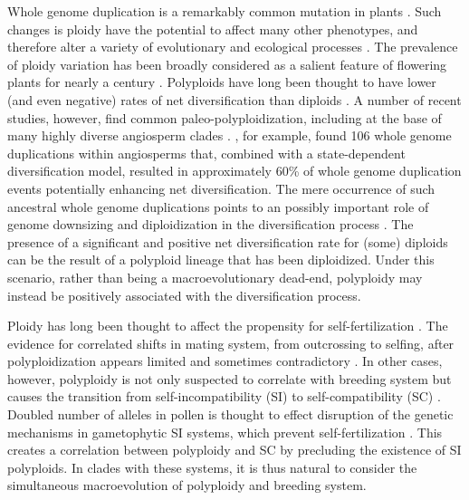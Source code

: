 Whole genome duplication is a remarkably common mutation in plants \citep{husband_2013, zenilferguson_2017}.
Such changes is ploidy have the potential to affect many other phenotypes, and therefore alter a variety of evolutionary \citep{ramsey_2002} and ecological processes \citep{sessa_2019}.
The prevalence of ploidy variation has been broadly considered as a salient feature of flowering plants for nearly a century \citep{stebbins1938}. 
Polyploids have long been thought to have lower (and even negative) rates of net diversification than diploids \citep{mayrose_2011, mayrose_2015}. 
A number of recent studies, however, find common paleo-polyploidization, including at the base of many highly diverse angiosperm clades \citep{soltis_2014}. 
\citet{landis_2018}, for example, found 106 whole genome duplications within angiosperms that, combined with a state-dependent diversification model, resulted in approximately 60\% of whole genome duplication events potentially enhancing net diversification.
The mere occurrence of such ancestral whole genome duplications points to an possibly important role of genome downsizing and diploidization in the diversification process \citep{soltis_2015diploidization, dodsworth_2015}. 
The presence of a significant and positive net diversification rate for (some) diploids can be  the result of a polyploid lineage that has been diploidized. 
Under this scenario, rather than being a macroevolutionary dead-end, polyploidy may instead be positively associated with the diversification process. 

Ploidy has long been thought to affect the propensity for self-fertilization \citep{stebbins1950}. 
The evidence for correlated shifts in mating system, from outcrossing to selfing, after polyploidization appears limited and sometimes contradictory \citep{barringer2007, barrett2008, husband2008}.
In other cases, however, polyploidy is not only suspected to correlate with breeding system but causes the transition from self-incompatibility (SI) to self-compatibility (SC) \citep{stout1942, lewis1947}.
Doubled number of alleles in pollen is thought to effect disruption of the genetic mechanisms in gametophytic SI systems, which prevent self-fertilization \citep{entani1999, tsukamoto2005, kubo2010}. 
This creates a correlation between polyploidy and SC by precluding the existence of SI polyploids.
In clades with these systems, it is thus natural to consider the simultaneous macroevolution of polyploidy and breeding system.

